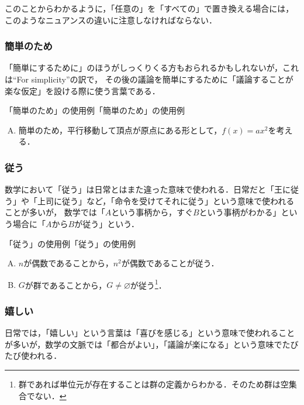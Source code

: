 \documentclass[a4paper,11pt]{ltjsarticle}
\begin{document}
このことからわかるように，「任意の」を「すべての」で置き換える場合には，このようなニュアンスの違いに注意しなければならない．

\subsubsection{簡単のため}

「簡単にするために」のほうがしっくりくる方もおられるかもしれないが，これは``For simplicity''の訳で，
その後の議論を簡単にするために「議論することが楽な仮定」を設ける際に使う言葉である．

\begin{example}{「簡単のため」の使用例}{「簡単のため」の使用例}
  \begin{enumerate}[(A)]
    \item 簡単のため，平行移動して頂点が原点にある形として，$f(x)=ax^2$を考える．
  \end{enumerate}
\end{example}

\subsubsection{従う}

数学において「従う」は日常とはまた違った意味で使われる．日常だと「王に従う」や「上司に従う」など，「命令を受けてそれに従う」という意味で使われることが多いが，
数学では「$A$という事柄から，すぐ$B$という事柄がわかる」という場合に「$A$から$B$が従う」という．

\begin{example}{「従う」の使用例}{「従う」の使用例}
  \begin{enumerate}[(A)]
    \item $n$が偶数であることから，$n^2$が偶数であることが従う．\label{enu:偶数ならば偶数}
    \item $G$が群であることから，$G \ne \varnothing$が従う\footnote{群であれば単位元が存在することは群の定義からわかる．そのため群は空集合でない．}．\label{enu:群の例}
  \end{enumerate}
\end{example}

\subsubsection{嬉しい}

日常では，「嬉しい」という言葉は「喜びを感じる」という意味で使われることが多いが，数学の文脈では「都合がよい」，「議論が楽になる」という意味でたびたび使われる．
\end{document}
